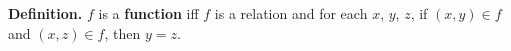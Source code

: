 \textbf{Definition.} $f$ is a \textbf{function} iff $f$ is a relation and for each $x$, $y$, $z$, if $(x,y) \in f$ and $(x,z) \in f$, then $y = z$.
